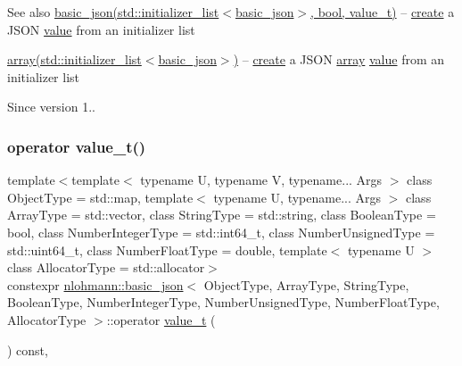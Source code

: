 \begin{DoxySeeAlso}{See also}
\hyperlink{classnlohmann_1_1basic__json_afeb998aec45296bc2050bd1c41ef41eb}{basic\+\_\+json(std\+::initializer\+\_\+list$<$basic\+\_\+json$>$, bool, value\+\_\+t)} -- \hyperlink{classnlohmann_1_1basic__json_afdb7a485369fbfd8c4c7c134ebb1feb5}{create} a J\+S\+ON \hyperlink{classnlohmann_1_1basic__json_a407e73a037e6e3067ef7aa2c25a79f39}{value} from an initializer list 

\hyperlink{classnlohmann_1_1basic__json_a5685815624b086caa532f41e853d4b0f}{array(std\+::initializer\+\_\+list$<$basic\+\_\+json$>$)} -- \hyperlink{classnlohmann_1_1basic__json_afdb7a485369fbfd8c4c7c134ebb1feb5}{create} a J\+S\+ON \hyperlink{classnlohmann_1_1basic__json_a5685815624b086caa532f41e853d4b0f}{array} \hyperlink{classnlohmann_1_1basic__json_a407e73a037e6e3067ef7aa2c25a79f39}{value} from an initializer list
\end{DoxySeeAlso}
\begin{DoxySince}{Since}
version 1.. 
\end{DoxySince}
\hypertarget{classnlohmann_1_1basic__json_a02397f02bb1182bf1e1bc7ecf7f2c227}{}\label{classnlohmann_1_1basic__json_a02397f02bb1182bf1e1bc7ecf7f2c227} 
\subsubsection{\texorpdfstring{operator value\+\_\+t()}{operator value\_t()}}
{\footnotesize\ttfamily template$<$template$<$ typename U, typename V, typename... Args $>$ class Object\+Type = std\+::map, template$<$ typename U, typename... Args $>$ class Array\+Type = std\+::vector, class String\+Type  = std\+::string, class Boolean\+Type  = bool, class Number\+Integer\+Type  = std\+::int64\+\_\+t, class Number\+Unsigned\+Type  = std\+::uint64\+\_\+t, class Number\+Float\+Type  = double, template$<$ typename U $>$ class Allocator\+Type = std\+::allocator$>$ \\
constexpr \hyperlink{classnlohmann_1_1basic__json}{nlohmann\+::basic\+\_\+json}$<$ Object\+Type, Array\+Type, String\+Type, Boolean\+Type, Number\+Integer\+Type, Number\+Unsigned\+Type, Number\+Float\+Type, Allocator\+Type $>$\+::operator \hyperlink{classnlohmann_1_1basic__json_a231b02148577b69a154b2ce2c87a5522}{value\+\_\+t} (\begin{DoxyParamCaption}{ }\end{DoxyParamCaption}) const\hspace{0.3cm}{\ttfamily [inline]}, {\ttfamily [noexcept]}}



